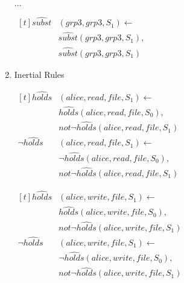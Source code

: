 \documentclass[global,twocolumn,draft]{svjour}
\newenvironment{vexample}
  {\begin{example}\hspace{0.25em}}
  {\end{example}}
\begin{document}
\begin{vexample}
\begin{enumerate}
              $\ldots$

              \begin{math}
                \begin{aligned}[t]
                  \hat{subst}&(grp3, grp3, S_{1}) \leftarrow \\
                  & \hat{subst}(grp3, grp3, S_{1}), \\
                  & \hat{subst}(grp3, grp3, S_{1})
                \end{aligned}
              \end{math}

            \item
              Inertial Rules

              \begin{math}
                \begin{aligned}[t]
                  \hat{holds}&(alice, read, file, S_{1}) \leftarrow \\
                  & \hat{holds}(alice, read, file, S_{0}), \\
                  & not \lnot \hat{holds}(alice, read, file, S_{1}) \\
                  \lnot \hat{holds}&(alice, read, file, S_{1}) \leftarrow \\
                  & \lnot \hat{holds}(alice, read, file, S_{0}), \\
                  & not \lnot \hat{holds}(alice, read, file, S_{1})
                \end{aligned}
              \end{math}

              \begin{math}
                \begin{aligned}[t]
                  \hat{holds}&(alice, write, file, S_{1}) \leftarrow \\
                  & \hat{holds}(alice, write, file, S_{0}), \\
                  & not \lnot \hat{holds}(alice, write, file, S_{1}) \\
                  \lnot \hat{holds}&(alice, write, file, S_{1}) \leftarrow \\
                  & \lnot \hat{holds}(alice, write, file, S_{0}), \\
                  & not \lnot \hat{holds}(alice, write, file, S_{1})
                \end{aligned}
              \end{math}


\end{enumerate}
\end{vexample}
\end{document}
